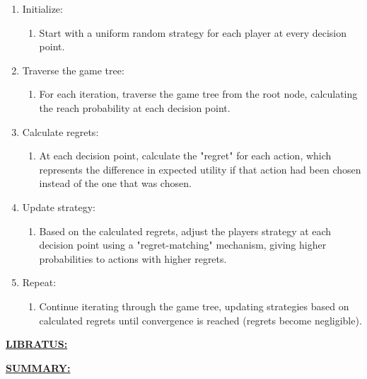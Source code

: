 \documentclass[
]{article}
\begin{document}
\begin{enumerate}
\def\labelenumi{\arabic{enumi}.}
\item
  Initialize:

  \begin{enumerate}
  \def\labelenumii{\alph{enumii}.}
  \item
    Start with a uniform random strategy for each player at every
    decision point.
  \end{enumerate}
\item
  Traverse the game tree:

  \begin{enumerate}
  \def\labelenumii{\alph{enumii}.}
  \item
    For each iteration, traverse the game tree from the root node,
    calculating the reach probability at each decision point.
  \end{enumerate}
\item
  Calculate regrets:

  \begin{enumerate}
  \def\labelenumii{\alph{enumii}.}
  \item
    At each decision point, calculate the "regret" for each action,
    which represents the difference in expected utility if that action
    had been chosen instead of the one that was chosen.
  \end{enumerate}
\item
  Update strategy:

  \begin{enumerate}
  \def\labelenumii{\alph{enumii}.}
  \item
    Based on the calculated regrets, adjust the player\textquotesingle s
    strategy at each decision point using a "regret-matching" mechanism,
    giving higher probabilities to actions with higher regrets.
  \end{enumerate}
\item
  Repeat:

  \begin{enumerate}
  \def\labelenumii{\alph{enumii}.}
  \item
    Continue iterating through the game tree, updating strategies based
    on calculated regrets until convergence is reached (regrets become
    negligible).
  \end{enumerate}
\end{enumerate}

\textbf{\ul{LIBRATUS:}}

\textbf{\ul{SUMMARY:}}
\end{document}

